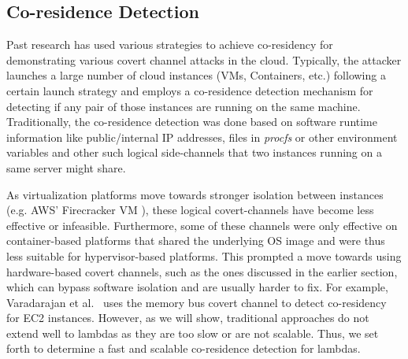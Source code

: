 \subsection{Co-residence Detection}
\label{sec:background:pastwork}

Past research has used various strategies to achieve co-residency for demonstrating 
various covert channel attacks in the cloud. Typically, the attacker launches a 
large number of cloud instances (VMs, Containers, etc.) following a certain 
launch strategy and employs a co-residence detection mechanism for detecting if
any pair of those instances are running on the same machine. 
Traditionally, the co-residence detection was done based on software runtime information 
like public/internal IP addresses\cite{ristenpartccs2009}, files in \textit{procfs} 
or other environment variables\cite{wangusenix2018} and other such logical
side-channels\cite{varad191016,vmplacement} that two instances running on a same
server might share.

As virtualization platforms move towards stronger isolation between instances
(e.g. AWS' Firecracker VM \cite{firecracker}), these logical covert-channels
have become less effective or infeasible. Furthermore, some of these
channels were only effective on container-based platforms that shared the
underlying OS image and were thus less suitable for hypervisor-based platforms.
This prompted a move towards using hardware-based covert channels, such as the 
ones discussed in the earlier section, which can bypass software isolation and 
are usually harder to fix. For example, Varadarajan et al.~\cite{varadarajan2015}
uses the memory bus covert channel to detect co-residency for EC2 instances. 
However, as we will show, traditional approaches do not extend well to lambdas 
as they are too slow or are not scalable. Thus, we set forth to determine a 
fast and scalable co-residence detection for lambdas.